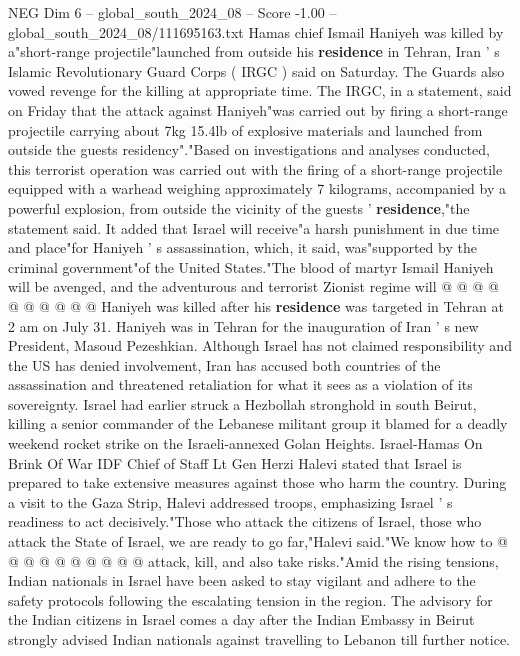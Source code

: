 \begin{textsample}{NEG Dim 6 – global\_south\_2024\_08 – Score -1.00 – global\_south\_2024\_08/111695163.txt}  \label{ex:f6_neg_132}
Hamas chief Ismail Haniyeh was killed by a"short-range projectile"launched from outside his \textbf{residence} in Tehran, Iran ' s Islamic Revolutionary Guard Corps ( IRGC ) said on Saturday.
The Guards also vowed revenge for the killing at appropriate time.
The IRGC, in a statement, said on Friday that the attack against Haniyeh"was carried out by firing a short-range projectile carrying about 7kg 15.4lb of explosive materials and launched from outside the guests residency"."Based on investigations and analyses conducted, this terrorist operation was carried out with the firing of a short-range projectile equipped with a warhead weighing approximately 7 kilograms, accompanied by a powerful explosion, from outside the vicinity of the guests ' \textbf{residence},"the statement said.
It added that Israel will receive"a harsh punishment in due time and place"for Haniyeh ' s assassination, which, it said, was"supported by the criminal government"of the United States."The blood of martyr Ismail Haniyeh will be avenged, and the adventurous and terrorist Zionist regime will @ @ @ @ @ @ @ @ @ @ Haniyeh was killed after his \textbf{residence} was targeted in Tehran at 2 am on July 31.
Haniyeh was in Tehran for the inauguration of Iran ' s new President, Masoud Pezeshkian.
Although Israel has not claimed responsibility and the US has denied involvement, Iran has accused both countries of the assassination and threatened retaliation for what it sees as a violation of its sovereignty.
Israel had earlier struck a Hezbollah stronghold in south Beirut, killing a senior commander of the Lebanese militant group it blamed for a deadly weekend rocket strike on the Israeli-annexed Golan Heights.
Israel-Hamas On Brink Of War IDF Chief of Staff Lt Gen Herzi Halevi stated that Israel is prepared to take extensive measures against those who harm the country.
During a visit to the Gaza Strip, Halevi addressed troops, emphasizing Israel ' s readiness to act decisively."Those who attack the citizens of Israel, those who attack the State of Israel, we are ready to go far,"Halevi said."We know how to @ @ @ @ @ @ @ @ @ @ attack, kill, and also take risks."Amid the rising tensions, Indian nationals in Israel have been asked to stay vigilant and adhere to the safety protocols following the escalating tension in the region.
The advisory for the Indian citizens in Israel comes a day after the Indian Embassy in Beirut strongly advised Indian nationals against travelling to Lebanon till further notice.

\end{textsample}
